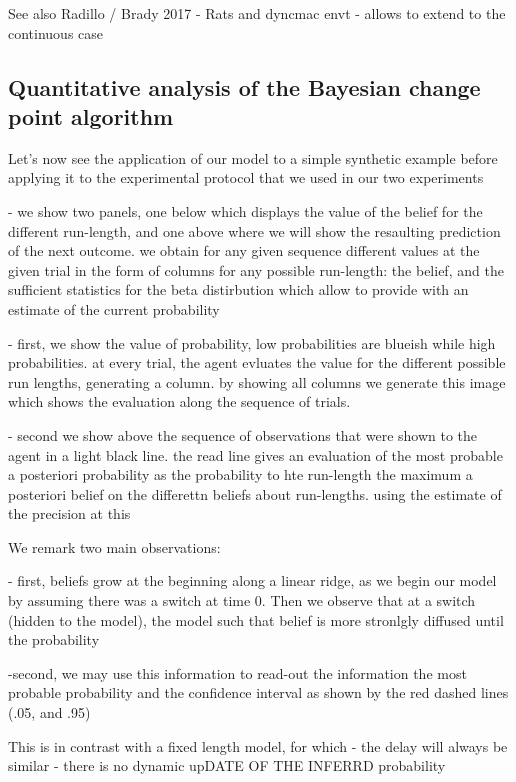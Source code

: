 \documentclass[profile,final,english, draft]{article}%
\begin{document}
See also Radillo / Brady 2017 - Rats and dyncmac envt - allows to extend to the continuous case

\subsection{Quantitative analysis of the Bayesian change point algorithm}

Let's now see the application of our model to a simple synthetic example before applying it to the experimental protocol that we used in our two experiments


- we show two panels, one below which displays the value of the belief for the different run-length, and one above where we will show the resaulting prediction of the next outcome.
we obtain for any given sequence different values at the given trial in the form of columns for any possible run-length: the belief,
and the sufficient statistics for the beta distirbution which allow to provide with an estimate of the current probability

- first, we show the value of probability, low probabilities are blueish while high probabilities. at every trial, the agent evluates the value for the different possible run lengths, generating a column. by showing all columns we generate this image which shows the evaluation along the sequence of trials.

- second we show above the sequence of observations that were shown to the agent in a light black line. the read line gives an evaluation of the most probable a posteriori probability as the probability to hte run-length the maximum a posteriori belief on the differettn beliefs about run-lengths. using the estimate of the precision at this

We remark two main observations:

- first, beliefs grow at the beginning along a linear ridge, as we begin our model by assuming there was a switch at time 0. Then we observe that at a switch (hidden to the model), the model
such that belief is more stronlgly diffused until the probability

-second, we may use this information to read-out the information the most probable probability and the confidence interval as shown by the red dashed lines (.05, and .95)


This is in contrast with a fixed length model, for which
- the delay will always be similar
- there is no dynamic upDATE OF THE INFERRD probability
\end{document}
